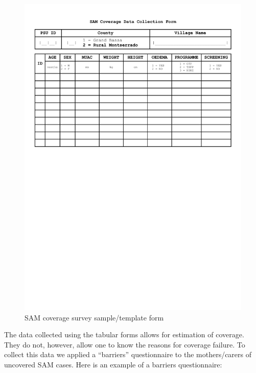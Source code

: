 \documentclass[12pt,a4paper]{article}
\begin{document}
\begin{figure}[H]

{\centering \includegraphics[width=0.9\linewidth]{forms/samForm} 

}

\caption{SAM coverage survey sample/template form}\label{fig:samform}
\end{figure}

The data collected using the tabular forms allows for estimation of coverage. They do not, however, allow one to know the reasons for coverage failure. To collect this data we applied a ``barriers'' questionnaire to the mothers/carers of uncovered SAM cases. Here is an example of a barriers questionnaire:

\newpage
\end{document}
